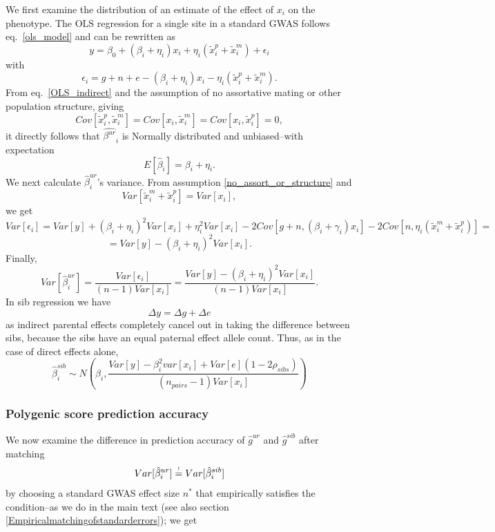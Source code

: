 \documentclass[hidelinks, 12pt]{article}
\begin{document}
We first examine the distribution of an estimate of the effect of $x_i$ on the phenotype.  The OLS regression for a single site in a standard GWAS follows eq.~\ref{ols_model} and can be rewritten as
\begin{equation}
\label{OLS_indirect}
y=\beta_0+(\beta_i+\eta_i)x_i+\eta_i(\tilde{x}_i^p+\tilde{x}_i^m)+\epsilon_i
\end{equation}
with
$$\epsilon_i=g+n+e-(\beta_i+\eta_i)x_i-\eta_i(\tilde{x}_i^p+\tilde{x}_i^m).$$
From eq.~\ref{OLS_indirect} and the assumption of no assortative mating or other population structure, giving 
\begin{equation}
\label{no_assort_or_structure}
Cov[\tilde{x}_i^p,\tilde{x}_i^m]=Cov[x_i,\tilde{x}_i^m]=Cov[x_i,\tilde{x}_i^p]=0,
\end{equation}
it directly follows that $\hat{\beta^{ur}}_i$ is Normally distributed and unbiased--with expectation 
$$E[\hat{\beta}_i]=\beta_i+\eta_i.$$
We next calculate $\hat{\beta}_i^{ur}$'s variance. From assumption \ref{no_assort_or_structure} and 
$$Var[\tilde{x}_i^m+\tilde{x}_i^p]=Var[x_i],$$
we get
$$Var[\epsilon_i]=Var[y]+(\beta_i+\eta_i)^2Var[x_i]+\eta_i^2Var[x_i]-2Cov[g+n,(\beta_i+\gamma_i)x_i]-2Cov[n,\eta_i(\tilde{x}_i^m+\tilde{x}_i^p)]=$$
$$=Var[y]-(\beta_i+\eta_i)^2Var[x_i].$$
Finally,
$$Var[\hat{\beta}_i^{ur}]=\frac{Var[\epsilon_i]}{(n-1)Var[x_i]}=\frac{Var[y]-(\beta_i+\eta_i)^2Var[x_i]}{(n-1)Var[x_i]}.$$
In sib regression we have
$$\Delta y=\Delta g+\Delta e$$
as indirect parental effects completely cancel out in taking the difference between sibs, because the sibs have an equal paternal effect allele count. Thus, as in the case of direct effects alone, 
$$\hat{\beta}_i^{sib} \sim N(\beta_i,\frac{Var[y] - \beta_i^2var[x_i] + Var[e](1-2\rho_{sibs})}{(n_{pairs}-1) Var[x_i]})$$

\subsubsection{Polygenic score prediction accuracy}
We now examine the difference in prediction accuracy of $\hat{g}^{ur}$ and $\hat{g}^{sib}$ after matching 
\begin{equation}
\label{matching_errors_indirect}
Var[\hat{\beta}_i^{ur}] \reqeq Var[\hat{\beta}_i^{sib}]
\end{equation}
by choosing a standard GWAS effect size $n^*$ that empirically satisfies the condition--as we do in the main text (see also section \ref{Empiricalmatchingofstandarderrors}); we get
\end{document}
